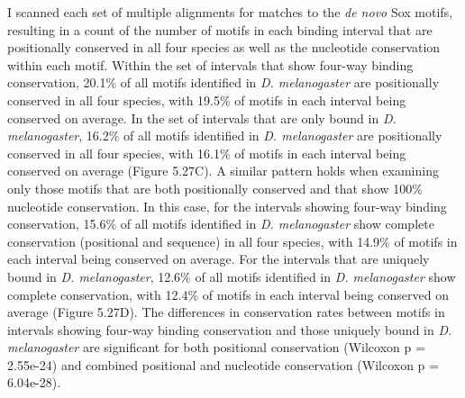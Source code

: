 I scanned each set of multiple alignments for matches to the \emph{de novo} Sox motifs, resulting in a count of the number of motifs in each binding interval that are positionally conserved in all four species as well as the nucleotide conservation within each motif. Within the set of intervals that show four-way binding conservation, 20.1\% of all motifs identified in \emph{D. melanogaster} are positionally conserved in all four species, with 19.5\% of motifs in each interval being conserved on average. In the set of intervals that are only bound in \emph{D. melanogaster}, 16.2\% of all motifs identified in \emph{D. melanogaster} are positionally conserved in all four species, with 16.1\% of motifs in each interval being conserved on average (Figure 5.27C). A similar pattern holds when examining only those motifs that are both positionally conserved and that show 100\% nucleotide conservation. In this case, for the intervals showing four-way binding conservation, 15.6\% of all motifs identified in \emph{D. melanogaster} show complete conservation (positional and sequence) in all four species, with 14.9\% of motifs in each interval being conserved on average. For the intervals that are uniquely bound in \emph{D. melanogaster}, 12.6\% of all motifs identified in \emph{D. melanogaster} show complete conservation, with 12.4\% of motifs in each interval being conserved on average (Figure 5.27D). The differences in conservation rates between motifs in intervals showing four-way binding conservation and those uniquely bound in \emph{D. melanogaster} are significant for both positional conservation (Wilcoxon p = 2.55e-24) and combined positional and nucleotide conservation (Wilcoxon p = 6.04e-28).

